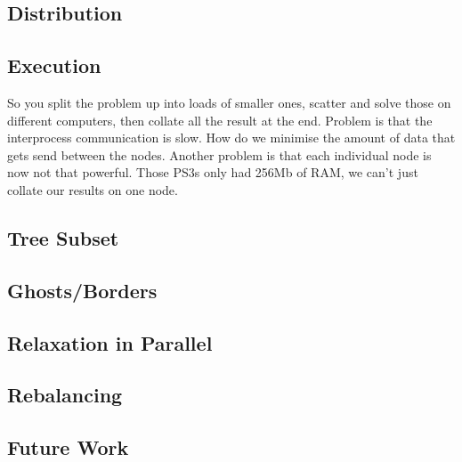 \documentclass[12pt]{article}
\begin{document}
    \subsection{Distribution}

    \subsection{Execution}
        So you split the problem up into loads of smaller ones, scatter and solve those on different computers, then collate all the result at the end. Problem is that the interprocess communication is slow. How do we minimise the amount of data that gets send between the nodes. Another problem is that each individual node is now not that powerful. Those PS3s only had 256Mb of RAM, we can't just collate our results on one node. 

    \subsection{Tree Subset}

    \subsection{Ghosts/Borders}


    \subsection{Relaxation in Parallel}

    \subsection{Rebalancing}

    \subsection{Future Work}
\end{document}
